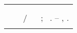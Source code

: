 %
\begin{fichacatalografica}
	\hspace{-1.4cm}
	\imprimirnotaautorizacao \\ \\
	\vspace*{\fill}					%
\begin{center}					%
  \imprimirnotabib \\
  \begin{table}[Htb]
	\scriptsize
	\centering	
	\begin{tabular}{|p{0.9cm} p{8.7cm}|}
		\hline
	      & \\
		  &	  \imprimirautorficha     \\
		
		 \imprimircutter & 
							\hspace{0.4cm}\imprimirtitulo~  / ~\imprimirautor~ ;  ~\imprimirorientadorcorpoficha. -- 	\imprimirlocal, \imprimirdata.   \\
		
		  &  %
		

\end{tabular}
\end{table}
\end{center}
\end{fichacatalografica}
